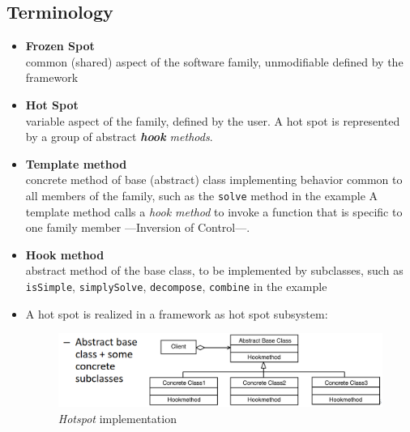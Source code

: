 \subsection{Terminology}
\begin{itemize}
   \item \textbf{Frozen Spot}\\
   common (shared) aspect of the software family, unmodifiable defined by the framework
   \item \textbf{Hot Spot}\\
   variable aspect of the family, defined by the user.
   A hot spot is represented by a group of abstract \textit{\textbf{hook} methods}.
   \item \textbf{Template method}\\
   concrete method of base (abstract) class implementing behavior common to all members of the family, such as the \texttt{solve} method in the example
   A template method calls a \textit{hook method} to invoke a function that is specific to one family member ---Inversion of Control---.
   \item \textbf{Hook method}\\
   abstract method of the base class, to be implemented by subclasses, such as \texttt{isSimple}, \texttt{simplySolve}, \texttt{decompose}, \texttt{combine} in the example
   \item A hot spot is realized in a framework as hot spot subsystem:
   \begin{figure}[htbp]
      \centering
      \includegraphics{images/hotspot.png}
      \caption{\textit{Hotspot} implementation}
      \label{fig:hotspot}
   \end{figure}
\end{itemize}
